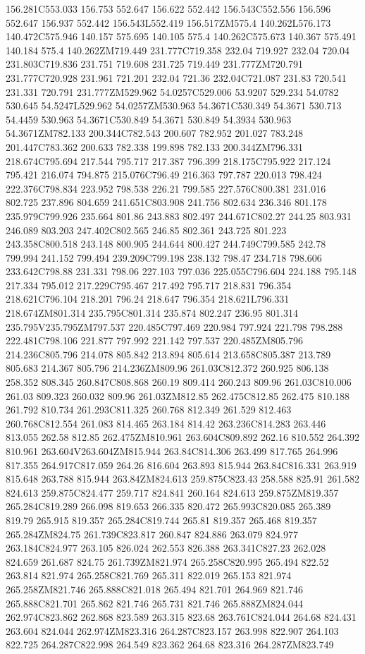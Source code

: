 156.281C553.033 156.753 552.647 156.622 552.442 156.543C552.556 156.596 552.647 156.937 552.442 156.543L552.419 156.517ZM575.4 140.262L576.173 140.472C575.946 140.157 575.695 140.105 575.4 140.262C575.673 140.367 575.491 140.184 575.4 140.262ZM719.449 231.777C719.358 232.04 719.927 232.04 720.04 231.803C719.836 231.751 719.608 231.725 719.449 231.777ZM720.791 231.777C720.928 231.961 721.201 232.04 721.36 232.04C721.087 231.83 720.541 231.331 720.791 231.777ZM529.962 54.0257C529.006 53.9207 529.234 54.0782 530.645 54.5247L529.962 54.0257ZM530.963 54.3671C530.349 54.3671 530.713 54.4459 530.963 54.3671C530.849 54.3671 530.849 54.3934 530.963 54.3671ZM782.133 200.344C782.543 200.607 782.952 201.027 783.248 201.447C783.362 200.633 782.338 199.898 782.133 200.344ZM796.331 218.674C795.694 217.544 795.717 217.387 796.399 218.175C795.922 217.124 795.421 216.074 794.875 215.076C796.49 216.363 797.787 220.013 798.424 222.376C798.834 223.952 798.538 226.21 799.585 227.576C800.381 231.016 802.725 237.896 804.659 241.651C803.908 241.756 802.634 236.346 801.178 235.979C799.926 235.664 801.86 243.883 802.497 244.671C802.27 244.25 803.931 246.089 803.203 247.402C802.565 246.85 802.361 243.725 801.223 243.358C800.518 243.148 800.905 244.644 800.427 244.749C799.585 242.78 799.994 241.152 799.494 239.209C799.198 238.132 798.47 234.718 798.606 233.642C798.88 231.331 798.06 227.103 797.036 225.055C796.604 224.188 795.148 217.334 795.012 217.229C795.467 217.492 795.717 218.831 796.354 218.621C796.104 218.201 796.24 218.647 796.354 218.621L796.331 218.674ZM801.314 235.795C801.314 235.874 802.247 236.95 801.314 235.795V235.795ZM797.537 220.485C797.469 220.984 797.924 221.798 798.288 222.481C798.106 221.877 797.992 221.142 797.537 220.485ZM805.796 214.236C805.796 214.078 805.842 213.894 805.614 213.658C805.387 213.789 805.683 214.367 805.796 214.236ZM809.96 261.03C812.372 260.925 806.138 258.352 808.345 260.847C808.868 260.19 809.414 260.243 809.96 261.03C810.006 261.03 809.323 260.032 809.96 261.03ZM812.85 262.475C812.85 262.475 810.188 261.792 810.734 261.293C811.325 260.768 812.349 261.529 812.463 260.768C812.554 261.083 814.465 263.184 814.42 263.236C814.283 263.446 813.055 262.58 812.85 262.475ZM810.961 263.604C809.892 262.16 810.552 264.392 810.961 263.604V263.604ZM815.944 263.84C814.306 263.499 817.765 264.996 817.355 264.917C817.059 264.26 816.604 263.893 815.944 263.84C816.331 263.919 815.648 263.788 815.944 263.84ZM824.613 259.875C823.43 258.588 825.91 261.582 824.613 259.875C824.477 259.717 824.841 260.164 824.613 259.875ZM819.357 265.284C819.289 266.098 819.653 266.335 820.472 265.993C820.085 265.389 819.79 265.915 819.357 265.284C819.744 265.81 819.357 265.468 819.357 265.284ZM824.75 261.739C823.817 260.847 824.886 263.079 824.977 263.184C824.977 263.105 826.024 262.553 826.388 263.341C827.23 262.028 824.659 261.687 824.75 261.739ZM821.974 265.258C820.995 265.494 822.52 263.814 821.974 265.258C821.769 265.311 822.019 265.153 821.974 265.258ZM821.746 265.888C821.018 265.494 821.701 264.969 821.746 265.888C821.701 265.862 821.746 265.731 821.746 265.888ZM824.044 262.974C823.862 262.868 823.589 263.315 823.68 263.761C824.044 264.68 824.431 263.604 824.044 262.974ZM823.316 264.287C823.157 263.998 822.907 264.103 822.725 264.287C822.998 264.549 823.362 264.68 823.316 264.287ZM823.749 